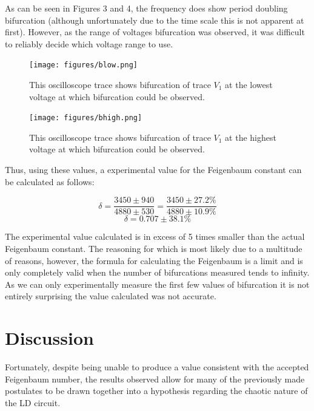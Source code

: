 \documentclass[10pt,twocolumn,letterpaper]{article}
\begin{document}
As can be seen in Figures 3 and 4, the frequency does show period doubling bifurcation (although unfortunately due to the time scale this is not apparent at first).  However, as the range of voltages bifurcation was observed, it was difficult to reliably decide which voltage range to use. 

\begin{figure}[h]
  \centering
  \texttt{[image: figures/blow.png]}
  \caption{This oscilloscope trace shows bifurcation of trace \(V_1\) at the lowest voltage at which bifurcation could be observed.}
\end{figure}
\begin{figure}[h]
  \centering
  \texttt{[image: figures/bhigh.png]}
  \caption{This oscilloscope trace shows bifurcation of trace \(V_1\) at the highest voltage at which bifurcation could be observed.}
\end{figure}

Thus, using these values, a experimental value for the Feigenbaum constant can be calculated as follows:

\[\delta = \frac{3450 \pm 940}{4880 \pm 530} = \frac{3450 \pm 27.2\%}{4880 \pm 10.9\%}\]
\[\delta = 0.707 \pm 38.1\%\]

The experimental value calculated is in excess of 5 times smaller than the actual Feigenbaum constant.  The reasoning for which is most likely due to a multitude of reasons, however, the formula for calculating the Feigenbaum is a limit and is only completely valid when the number of bifurcations measured tends to infinity.  As we can only experimentally measure the first few values of bifurcation it is not entirely surprising the value calculated was not accurate.

\section{Discussion}
Fortunately, despite being unable to produce a value consistent with the accepted Feigenbaum number, the results observed allow for many of the previously made postulates to be drawn together into a hypothesis regarding the chaotic nature of the LD circuit. 
\end{document}
